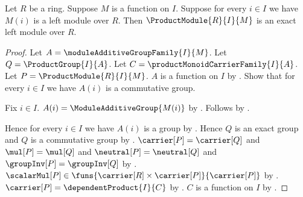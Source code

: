 \begin{theorem}\label{product_module_is_exact}
    Let $R$ be a ring.
    Suppose $M$ is a function on $I$.
    Suppose for every $i\in I$ we have $M(i)$ is a left module over $R$.
    Then $\ProductModule{R}{I}{M}$ is an exact left module over $R$.
\end{theorem}
\begin{proof}
    Let $A=\moduleAdditiveGroupFamily{I}{M}$.
    Let $Q=\ProductGroup{I}{A}$.
    Let $C=\productMonoidCarrierFamily{I}{A}$.
    Let $P=\ProductModule{R}{I}{M}$.
    $A$ is a function on $I$ by
        .
    Show that for every $i\in I$ we have $A(i)$ is a commutative group.
    \begin{subproof}
        Fix $i\in I$.
        $A(i)=\ModuleAdditiveGroup{M(i)}$ by
            .
        Follows by .
    \end{subproof}
    Hence for every $i\in I$ we have $A(i)$ is a group by
        .
    Hence $Q$ is an exact group and $Q$ is a commutative group by
        .
    $\carrier[P]=\carrier[Q]$ and $\mul[P]=\mul[Q]$ and
        $\neutral[P]=\neutral[Q]$ and
        $\groupInv[P]=\groupInv[Q]$ by
        .
    $\scalarMul[P]\in
        \funs{\carrier[R]\times\carrier[P]}{\carrier[P]}$ by
        .
    $\carrier[P]=\dependentProduct{I}{C}$ by
        .
    $C$ is a function on $I$ by
        .


\end{proof}
